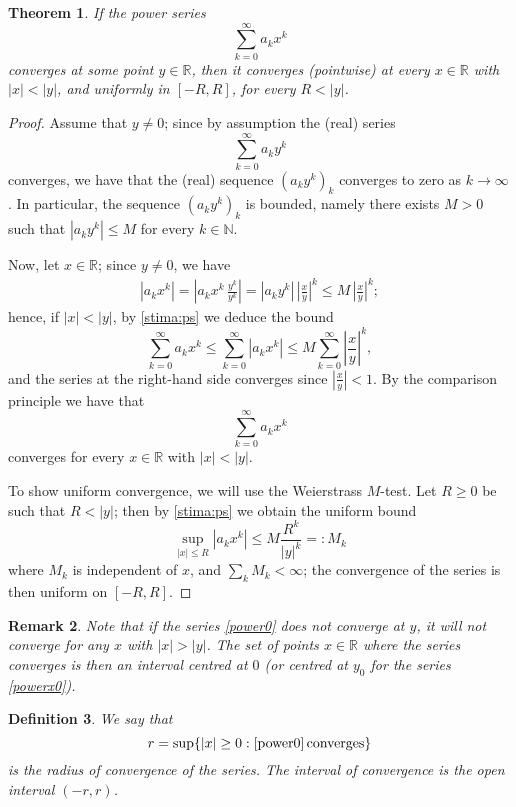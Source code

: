 \documentclass[a4paper,reqno]{amsart}
\numberwithin{equation}{section}
\newtheorem{definition}{Definition}[section]
\newtheorem{theorem}[definition]{Theorem}
\newtheorem{remark}[definition]{Remark}
\def\N{\mathbb{N}}
\def\R{\mathbb{R}}
\begin{document}
\begin{theorem}\label{unifpt_ps}
If the power series
$$
\sum_{k=0}^\infty a_k x^k
$$
converges at some point $y\in \R$, then it converges (pointwise) at every $x\in \R$ with $|x|< |y|$, and uniformly in $[-R,R]$, for every $R<|y|$.
\end{theorem}

\begin{proof}
Assume that $y\neq 0$; since by assumption the (real) series
$$
\sum_{k=0}^\infty a_k y^k
$$
converges, we have that the (real) sequence $(a_k y^k)_k$ converges to zero as $k\to \infty$. In particular, the sequence $(a_k y^k)_k$ is bounded, namely there exists
$M>0$ such that $|a_k y^k| \leq M$ for every $k\in \N$.

Now, let $x\in \R$; since $y\neq 0$, we have
\begin{align}\label{stima:ps}
|a_k x^k| = \left| a_k x^k \, \frac{y^k}{y^k} \right| = |a_k y^k| \, \left| \frac{x}{y}\right|^k \leq M \, \left| \frac{x}{y}\right|^k;
\end{align}
hence, if $|x|<|y|$, by \eqref{stima:ps} we deduce the bound
$$
\sum_{k=0}^\infty a_k x^k \leq \sum_{k=0}^\infty |a_k x^k| \leq M \sum_{k=0}^\infty \left| \frac{x}{y}\right|^k,
$$
and the series at the right-hand side converges since $\left| \frac{x}{y}\right| <1$. By the comparison principle we have that
$$
\sum_{k=0}^\infty a_k x^k
$$
converges for every $x\in \R$ with $|x|<|y|$.

To show uniform convergence, we will use the Weierstrass $M$-test. Let $R\geq 0$ be such that $R<|y|$; then by \eqref{stima:ps} we obtain the uniform bound
$$
\sup_{|x|\leq R}  |a_k x^k| \leq M \frac{R^k}{|y|^k} =:M_k
$$
where $M_k$ is independent of $x$, and $\sum_k M_k<\infty$; the convergence of the series is then uniform on $[-R,R]$.

\end{proof}



\begin{remark}
Note that if the series \eqref{power0} does not converge at $y$, it will not converge for any $x$ with $|x|>|y|$. The set of points $x\in \R$ where the series converges is then an
interval centred at $0$ (or centred at $y_0$ for the series \eqref{powerx0}).
\end{remark}

\begin{definition}
We say that
$$
r = \sup \{|x|\geq 0: \eqref{power0} \, \textrm{converges}\}
$$
is the radius of convergence of the series. The interval of convergence is the open interval $(-r,r)$.
\end{definition}
\end{document}
